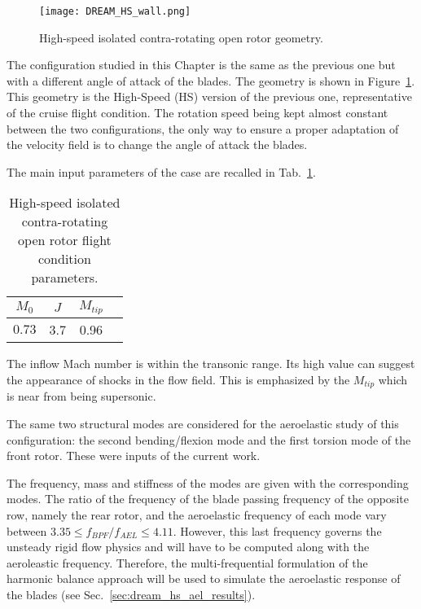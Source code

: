 
\begin{figure}[htp]
  \centering
  \texttt{[image: DREAM\_HS\_wall.png]}
  \caption{High-speed isolated contra-rotating open rotor geometry.}
  \label{fig:dream_hs_wall}
\end{figure}

The configuration studied in this Chapter is the same as the
previous one but with a different angle of attack of
the blades. The geometry is shown in Figure~\ref{fig:dream_hs_wall}.
This geometry is the High-Speed (HS) version of the previous one, 
representative of the cruise flight condition. The rotation speed being kept
almost constant between the two configurations, the only way to ensure
a proper adaptation of the velocity field is to change the angle of 
attack the blades.

The main input parameters of the case are recalled in
Tab.~\ref{tab:dream_hs_flight_condition}.
\begin{table}[htp]
   \centering
  \begin{tabular}{cccc}
    \toprule
    $M_0$ & $J$ & $M_{tip}$ \\
    \midrule
    $0.73$ & 3.7 & 0.96  \\
    \bottomrule
  \end{tabular}
  \caption{High-speed isolated contra-rotating open rotor flight condition parameters.}
  \label{tab:dream_hs_flight_condition}
\end{table} 
The inflow Mach number is within the transonic range. Its high value
can suggest the appearance of shocks in the flow field. 
This is emphasized by the $M_{tip}$ which is
near from being supersonic.

The same two structural modes are considered for the aeroelastic study of this 
configuration: the second bending/flexion mode and the first torsion mode
of the front rotor. These were inputs of the current work.

The frequency, mass and stiffness of the modes 
are given with the corresponding modes.
The ratio of the frequency of the blade passing 
frequency of the opposite row, namely the rear rotor,
and the aeroelastic frequency of
each mode vary between 
$3.35 \leq f_{BPF} / f_{AEL} \leq 4.11$. However,
this last frequency governs the unsteady rigid flow physics 
and will have to be computed along with the aeroleastic frequency.
Therefore, the multi-frequential formulation of the
harmonic balance approach will be used to simulate the
aeroelastic response of the blades (see Sec.~\ref{sec:dream_hs_ael_results}).

